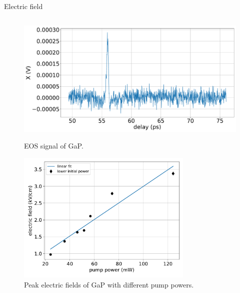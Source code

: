 \documentclass[aspectratio=1610, 9pt]{beamer}
\begin{document}
\begin{frame}{Electric field}
\begin{center}
\begin{columns}
\begin{column}{.5\textwidth}
\begin{figure}
\begin{overprint}
        \includegraphics[width=\textwidth]{images/GaP14_55_42normalX.pdf}\caption{EOS signal of GaP.}
        \includegraphics[width=0.75\textwidth]{images/eltric_field_GaP.pdf}\caption{Peak electric fields of GaP with different pump powers.}
      \end{overprint}
    \end{figure}
  \end{column}
  \end{columns}
\end{center}
\end{frame}
\end{document}
